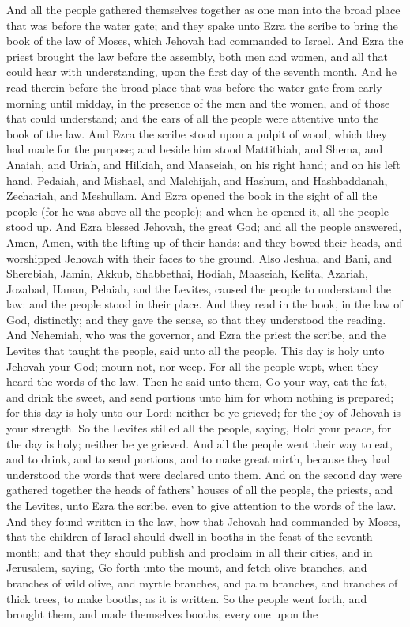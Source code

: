 And all the people gathered themselves together as one man into the broad place that was before the water gate; and they spake unto Ezra the scribe to bring the book of the law of Moses, which Jehovah had commanded to Israel. And Ezra the priest brought the law before the assembly, both men and women, and all that could hear with understanding, upon the first day of the seventh month. And he read therein before the broad place that was before the water gate from early morning until midday, in the presence of the men and the women, and of those that could understand; and the ears of all the people were attentive unto the book of the law. And Ezra the scribe stood upon a pulpit of wood, which they had made for the purpose; and beside him stood Mattithiah, and Shema, and Anaiah, and Uriah, and Hilkiah, and Maaseiah, on his right hand; and on his left hand, Pedaiah, and Mishael, and Malchijah, and Hashum, and Hashbaddanah, Zechariah, and Meshullam. And Ezra opened the book in the sight of all the people (for he was above all the people); and when he opened it, all the people stood up. And Ezra blessed Jehovah, the great God; and all the people answered, Amen, Amen, with the lifting up of their hands: and they bowed their heads, and worshipped Jehovah with their faces to the ground. Also Jeshua, and Bani, and Sherebiah, Jamin, Akkub, Shabbethai, Hodiah, Maaseiah, Kelita, Azariah, Jozabad, Hanan, Pelaiah, and the Levites, caused the people to understand the law: and the people stood in their place. And they read in the book, in the law of God, distinctly; and they gave the sense, so that they understood the reading.  And Nehemiah, who was the governor, and Ezra the priest the scribe, and the Levites that taught the people, said unto all the people, This day is holy unto Jehovah your God; mourn not, nor weep. For all the people wept, when they heard the words of the law. Then he said unto them, Go your way, eat the fat, and drink the sweet, and send portions unto him for whom nothing is prepared; for this day is holy unto our Lord: neither be ye grieved; for the joy of Jehovah is your strength. So the Levites stilled all the people, saying, Hold your peace, for the day is holy; neither be ye grieved. And all the people went their way to eat, and to drink, and to send portions, and to make great mirth, because they had understood the words that were declared unto them.  And on the second day were gathered together the heads of fathers’ houses of all the people, the priests, and the Levites, unto Ezra the scribe, even to give attention to the words of the law. And they found written in the law, how that Jehovah had commanded by Moses, that the children of Israel should dwell in booths in the feast of the seventh month; and that they should publish and proclaim in all their cities, and in Jerusalem, saying, Go forth unto the mount, and fetch olive branches, and branches of wild olive, and myrtle branches, and palm branches, and branches of thick trees, to make booths, as it is written. So the people went forth, and brought them, and made themselves booths, every one upon the 